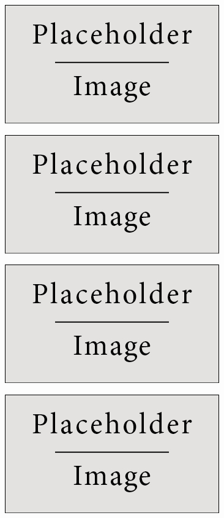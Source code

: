 \documentclass[landscape,a0paper,fontscale=0.285]{baposter} %
\begin{document}
\begin{poster}
{\begin{multicols}{2}
\begin{center}
\includegraphics[width=0.55\linewidth]{placeholder.jpg}

\includegraphics[width=0.55\linewidth]{placeholder.jpg}





\end{center}
\end{multicols}


\begin{multicols}{2}
\vspace{1em}



\begin{center}
    
\includegraphics[width=0.55\linewidth]{placeholder.jpg}

\includegraphics[width=0.55\linewidth]{placeholder.jpg}


\end{center}
\end{multicols}}
\end{poster}
\end{document}
